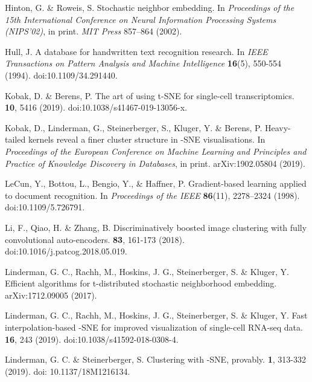 \documentclass{article}
\begin{document}
\begin{thebibliography}{1}
Hinton, G. \& Roweis, S.
\newblock Stochastic neighbor embedding.
\newblock In {\em Proceedings of the 15th International Conference on Neural Information Processing Systems (NIPS’02)}, in print. {\em MIT Press} 857–864 (2002).

Hull, J.
\newblock A database for handwritten text recognition research.
\newblock In {\em IEEE Transactions on Pattern Analysis and Machine Intelligence} \textbf{16}(5), 550-554 (1994). doi:10.1109/34.291440.

Kobak, D. \& Berens, P.
\newblock The art of using t-SNE for single-cell transcriptomics.
 \textbf{10}, 5416 (2019). doi:10.1038/s41467-019-13056-x.

Kobak, D., Linderman, G., Steinerberger, S., Kluger, Y. \& Berens, P.
\newblock Heavy-tailed kernels reveal a finer cluster structure in -SNE visualisations.
\newblock In {\em Proceedings of the European Conference on Machine Learning and Principles and Practice of Knowledge Discovery in Databases}, in print. arXiv:1902.05804 (2019).

LeCun, Y., Bottou, L., Bengio, Y., \& Haffner, P.
\newblock Gradient-based learning applied to document recognition.
\newblock In {\em Proceedings of the IEEE} \textbf{86}(11), 2278–2324 (1998). doi:10.1109/5.726791.

Li, F., Qiao, H. \& Zhang, B. 
\newblock Discriminatively boosted image clustering with fully convolutional auto-encoders.
 \textbf{83}, 161-173 (2018). doi:10.1016/j.patcog.2018.05.019.

Linderman, G. C., Rachh, M., Hoskins, J. G., Steinerberger, S. \& Kluger, Y.
\newblock Efficient algorithms for t-distributed stochastic neighborhood embedding.
 arXiv:1712.09005 (2017).

Linderman, G. C., Rachh, M., Hoskins, J. G., Steinerberger, S. \& Kluger, Y.
\newblock Fast interpolation-based -SNE for improved visualization of single-cell RNA-seq data.
 \textbf{16}, 243 (2019). doi:10.1038/s41592-018-0308-4.

Linderman, G. C. \& Steinerberger, S.
\newblock Clustering with -SNE, provably.
 \textbf{1}, 313-332 (2019). doi: 10.1137/18M1216134.


\end{thebibliography}
\end{document}
